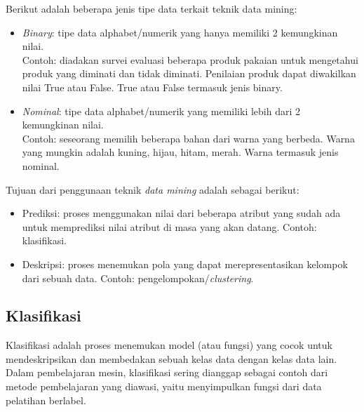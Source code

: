 \noindent Berikut adalah beberapa jenis tipe data terkait teknik data mining:

\begin{itemize}

\item \textit{Binary}: tipe data alphabet/numerik yang hanya memiliki 2 kemungkinan nilai.\\
Contoh: diadakan survei evaluasi beberapa produk pakaian untuk mengetahui produk yang diminati dan tidak diminati. Penilaian produk dapat diwakilkan nilai True atau False. True atau False termasuk jenis binary.

\item \textit{Nominal}: tipe data alphabet/numerik yang memiliki lebih dari 2 kemungkinan nilai.\\
Contoh: seseorang memilih beberapa bahan dari warna yang berbeda. Warna yang mungkin adalah kuning, hijau, hitam, merah. Warna termasuk jenis nominal.

\end{itemize}

\noindent Tujuan dari penggunaan teknik \textit{data mining} adalah sebagai berikut:

\begin{itemize}

\item Prediksi: proses menggunakan nilai dari beberapa atribut yang sudah ada untuk memprediksi nilai atribut di masa yang akan datang. Contoh: klasifikasi.

\item Deskripsi: proses menemukan pola yang dapat merepresentasikan kelompok dari sebuah data. Contoh: pengelompokan/\textit{clustering}.

\end{itemize}

\subsection{Klasifikasi} 
Klasifikasi adalah proses menemukan model (atau fungsi) yang cocok untuk mendeskripsikan dan membedakan sebuah kelas data dengan kelas data lain. Dalam pembelajaran mesin, klasifikasi sering dianggap sebagai contoh dari metode pembelajaran yang diawasi, yaitu menyimpulkan fungsi dari data pelatihan berlabel. \\

